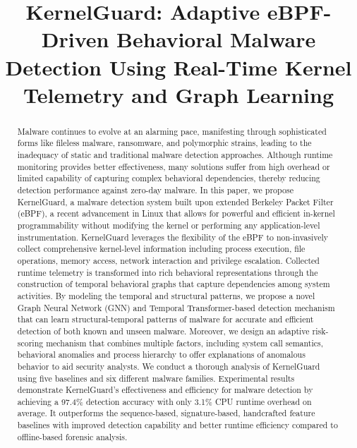 \documentclass[conference]{IEEEtran}
\begin{document}
\title{KernelGuard: Adaptive eBPF-Driven Behavioral Malware Detection Using Real-Time Kernel Telemetry and Graph Learning\\}

\maketitle

\begin{abstract}
Malware continues to evolve at an alarming pace, manifesting through sophisticated forms like fileless malware, ransomware, and polymorphic strains, leading to the inadequacy of static and traditional malware detection approaches. Although runtime monitoring provides better effectiveness, many solutions suffer from high overhead or limited capability of capturing complex behavioral dependencies, thereby reducing detection performance against zero-day malware. In this paper, we propose KernelGuard, a malware detection system built upon extended Berkeley Packet Filter (eBPF), a recent advancement in Linux that allows for powerful and efficient in-kernel programmability without modifying the kernel or performing any application-level instrumentation. KernelGuard leverages the flexibility of the eBPF to non-invasively collect comprehensive kernel-level information including process execution, file operations, memory access, network interaction and privilege escalation. Collected runtime telemetry is transformed into rich behavioral representations through the construction of temporal behavioral graphs that capture dependencies among system activities. By modeling the temporal and structural patterns, we propose a novel Graph Neural Network (GNN) and Temporal Transformer-based detection mechanism that can learn structural-temporal patterns of malware for accurate and efficient detection of both known and unseen malware. Moreover, we design an adaptive risk-scoring mechanism that combines multiple factors, including system call semantics, behavioral anomalies and process hierarchy to offer explanations of anomalous behavior to aid security analysts. We conduct a thorough analysis of KernelGuard using five baselines and six different malware families. Experimental results demonstrate KernelGuard's effectiveness and efficiency for malware detection by achieving a 97.4\% detection accuracy with only 3.1\% CPU runtime overhead on average. It outperforms the sequence-based, signature-based, handcrafted feature baselines with improved detection capability and better runtime efficiency compared to offline-based forensic analysis.




\end{abstract}
\end{document}
